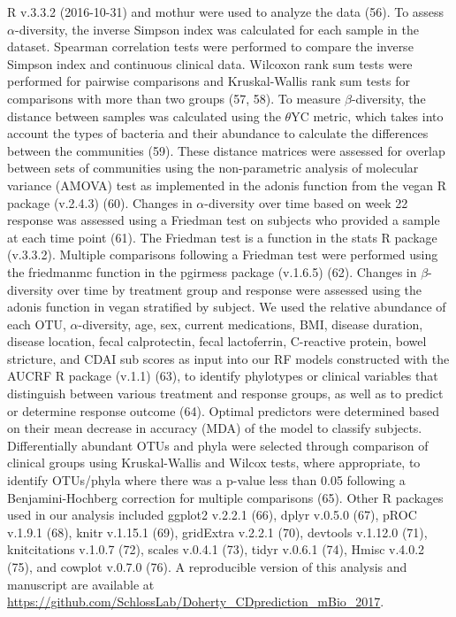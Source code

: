 \documentclass[12pt,]{article}
\begin{document}
R v.3.3.2 (2016-10-31) and mothur were used to analyze the data (56). To
assess \({\alpha}\)-diversity, the inverse Simpson index was calculated
for each sample in the dataset. Spearman correlation tests were
performed to compare the inverse Simpson index and continuous clinical
data. Wilcoxon rank sum tests were performed for pairwise comparisons
and Kruskal-Wallis rank sum tests for comparisons with more than two
groups (57, 58). To measure \({\beta}\)-diversity, the distance between
samples was calculated using the \({\theta}\)YC metric, which takes into
account the types of bacteria and their abundance to calculate the
differences between the communities (59). These distance matrices were
assessed for overlap between sets of communities using the
non-parametric analysis of molecular variance (AMOVA) test as
implemented in the adonis function from the vegan R package (v.2.4.3)
(60). Changes in \({\alpha}\)-diversity over time based on week 22
response was assessed using a Friedman test on subjects who provided a
sample at each time point (61). The Friedman test is a function in the
stats R package (v.3.3.2). Multiple comparisons following a Friedman
test were performed using the friedmanmc function in the pgirmess
package (v.1.6.5) (62). Changes in \({\beta}\)-diversity over time by
treatment group and response were assessed using the adonis function in
vegan stratified by subject. We used the relative abundance of each OTU,
\({\alpha}\)-diversity, age, sex, current medications, BMI, disease
duration, disease location, fecal calprotectin, fecal lactoferrin,
C-reactive protein, bowel stricture, and CDAI sub scores as input into
our RF models constructed with the AUCRF R package (v.1.1) (63), to
identify phylotypes or clinical variables that distinguish between
various treatment and response groups, as well as to predict or
determine response outcome (64). Optimal predictors were determined
based on their mean decrease in accuracy (MDA) of the model to classify
subjects. Differentially abundant OTUs and phyla were selected through
comparison of clinical groups using Kruskal-Wallis and Wilcox tests,
where appropriate, to identify OTUs/phyla where there was a p-value less
than 0.05 following a Benjamini-Hochberg correction for multiple
comparisons (65). Other R packages used in our analysis included ggplot2
v.2.2.1 (66), dplyr v.0.5.0 (67), pROC v.1.9.1 (68), knitr v.1.15.1
(69), gridExtra v.2.2.1 (70), devtools v.1.12.0 (71), knitcitations
v.1.0.7 (72), scales v.0.4.1 (73), tidyr v.0.6.1 (74), Hmisc v.4.0.2
(75), and cowplot v.0.7.0 (76). A reproducible version of this analysis
and manuscript are available at
\url{https://github.com/SchlossLab/Doherty_CDprediction_mBio_2017}.
\end{document}
